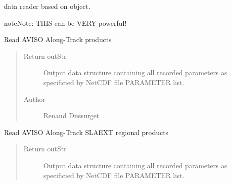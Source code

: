 \documentclass[letterpaper,10pt,english]{sphinxmanual}
\begin{document}
\begin{fulllineitems}

\begin{fulllineitems}
\label{altimetry.data:altimetry.data.alti_data.read_nc}
data reader based on {\hyperref[altimetry.tools.nctools:altimetry.tools.nctools.nc]{}} object.

\begin{notice}{note}{Note:}
THIS can be VERY powerful!
\end{notice}

\end{fulllineitems}


\begin{fulllineitems}
\label{altimetry.data:altimetry.data.alti_data.read_sla}
Read AVISO Along-Track products
\begin{quote}\begin{description}
\item[{Return outStr}] \leavevmode
Output data structure containing all recorded parameters as specificied by NetCDF file PARAMETER list.

\item[{Author }] \leavevmode
Renaud Dussurget

\end{description}\end{quote}

\end{fulllineitems}


\begin{fulllineitems}
\label{altimetry.data:altimetry.data.alti_data.read_slaext}
Read AVISO Along-Track SLAEXT regional products
\begin{quote}\begin{description}
\item[{Return outStr}] \leavevmode
Output data structure containing all recorded parameters as specificied by NetCDF file PARAMETER list.


\end{description}
\end{quote}
\end{fulllineitems}
\end{fulllineitems}
\end{document}
